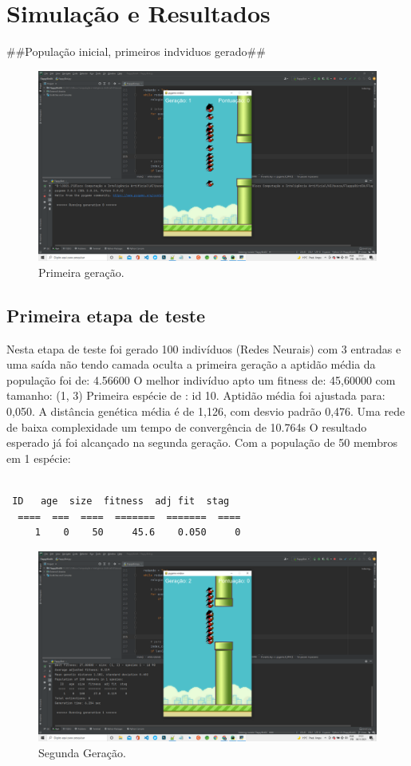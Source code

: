 \section{Simulação e Resultados}\label{sec:experimental}
%

##População inicial, primeiros indviduos gerado##
\begin{figure}[htpb!]
    \centering 
    \includegraphics[width=4cm\linewidth]{images/1g_pt0.png}
    
    \caption{Primeira geração.}
    \label{fig:gym}
\end{figure}
\subsection{\textbf{Primeira etapa de teste}}
Nesta etapa de teste foi gerado 100 indivíduos (Redes Neurais)
com 3 entradas e uma saída não tendo camada oculta
a primeira geração a aptidão média da população foi de: 4.56600 
O melhor indivíduo  apto um fitness de: 45,60000 com tamanho: (1, 3)
Primeira espécie de : id 10.
Aptidão média foi ajustada para: 0,050.
A distância genética média é de 1,126, com desvio padrão 0,476.
Uma rede de baixa complexidade um tempo de convergência de 10.764s
O resultado esperado já foi alcançado na segunda geração. 
Com a população de 50 membros em 1 espécie:

\begin{lstlisting}

 ID   age  size  fitness  adj fit  stag
  ====  ===  ====  =======  =======  ====
     1    0    50     45.6    0.050     0

\end{lstlisting}
\begin{figure}[htpb!]
    \centering 
    \includegraphics[width=0.6\linewidth]{images/2g_pt2.png}
    \caption{Segunda Geração.}
    \label{fig:gym}
\end{figure}
%

